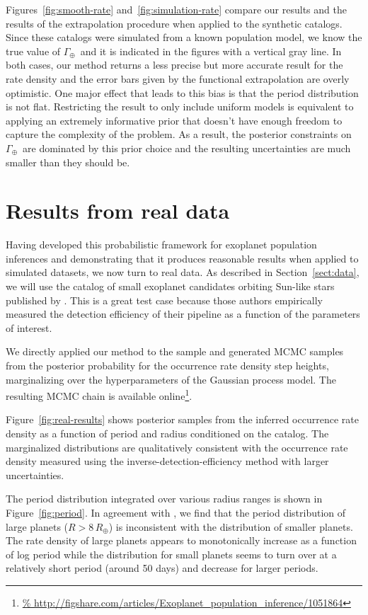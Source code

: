 \documentclass[12pt,preprint]{aastex}
\newcommand{\figref}[1]{\ref{fig:#1}}
\newcommand{\Fig}[1]{Figure~\figref{#1}}
\newcommand{\fig}[1]{\Fig{#1}}
\newcommand{\Sect}[1]{Section~\ref{sect:#1}}
\newcommand{\sect}[1]{\Sect{#1}}
\newcommand{\sectlabel}[1]{\label{sect:#1}}
\newcommand{\rate}{\ensuremath{\Gamma}}
\newcommand{\gammaearth}{{\ensuremath{\rate_\oplus}}}
\begin{document}
Figures~\figref{smooth-rate} and~\figref{simulation-rate} compare our results
and the results of the \citet{petigura} extrapolation procedure when applied
to the synthetic catalogs.
Since these catalogs were simulated from a known population model, we know the
true value of \gammaearth\ and it is indicated in the figures with a vertical
gray line.
In both cases, our method returns a less precise but more accurate result for
the rate density and the error bars given by the functional extrapolation
are overly optimistic.
One major effect that leads to this bias is that the period distribution is
not flat.
Restricting the result to only include uniform models is equivalent to
applying an extremely informative prior that doesn't have enough freedom to
capture the complexity of the problem.
As a result, the posterior constraints on \gammaearth\ are dominated by this
prior choice and the resulting uncertainties are much smaller than they should
be.

\section{Results from real data}
\sectlabel{real}

Having developed this probabilistic framework for exoplanet population
inferences and demonstrating that it produces reasonable results when applied
to simulated datasets, we now turn to real data.
As described in \sect{data}, we will use the catalog of small exoplanet
candidates orbiting Sun-like stars published by \citet{petigura}.
This is a great test case because those authors empirically measured the
detection efficiency of their pipeline as a function of the parameters of
interest.

We directly applied our method to the \citet{petigura} sample and generated
MCMC samples from the posterior probability for the occurrence rate density
step heights, marginalizing over the hyperparameters of the Gaussian process
model.
The resulting MCMC chain is available online\footnote{\url{%
http://figshare.com/articles/Exoplanet_population_inference/1051864}}.

\Fig{real-results} shows posterior samples from the inferred occurrence rate
density as a function of period and radius conditioned on the catalog.
The marginalized distributions are qualitatively consistent with the
occurrence rate density measured using the inverse-detection-efficiency
method with larger uncertainties.

The period distribution integrated over various radius ranges is shown in
\fig{period}.
In agreement with \citet{dong}, we find that the period distribution of large
planets ($R > 8\,R_\oplus$) is inconsistent with the distribution of smaller
planets.
The rate density of large planets appears to monotonically increase as a
function of log period while the distribution for small planets seems to turn
over at a relatively short period (around 50 days) and decrease for larger
periods.
\end{document}
